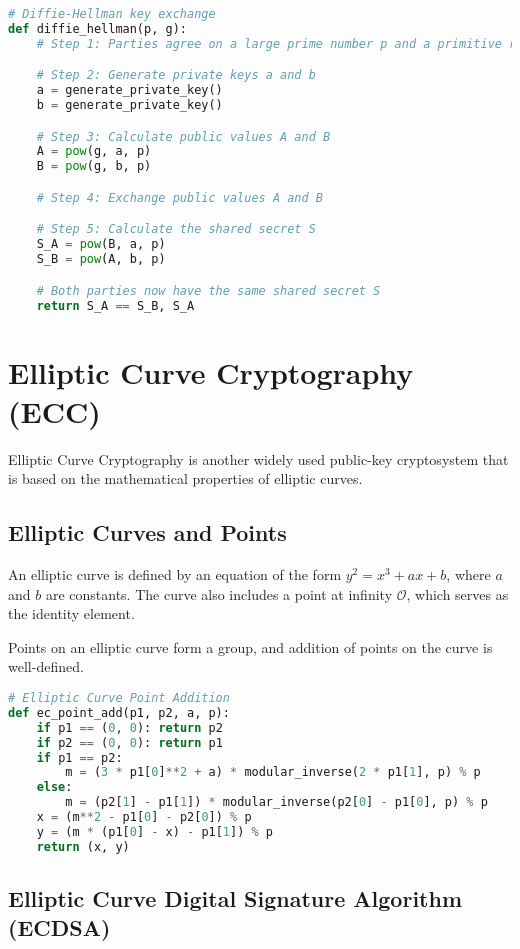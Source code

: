 \documentclass{article}
\begin{document}
\begin{lstlisting}[language=Python]
# Diffie-Hellman key exchange
def diffie_hellman(p, g):
    # Step 1: Parties agree on a large prime number p and a primitive root g modulo p

    # Step 2: Generate private keys a and b
    a = generate_private_key()
    b = generate_private_key()

    # Step 3: Calculate public values A and B
    A = pow(g, a, p)
    B = pow(g, b, p)

    # Step 4: Exchange public values A and B

    # Step 5: Calculate the shared secret S
    S_A = pow(B, a, p)
    S_B = pow(A, b, p)

    # Both parties now have the same shared secret S
    return S_A == S_B, S_A
\end{lstlisting}

\section{Elliptic Curve Cryptography (ECC)}

Elliptic Curve Cryptography is another widely used public-key cryptosystem that is based on the mathematical properties of elliptic curves.

\subsection{Elliptic Curves and Points}

An elliptic curve is defined by an equation of the form $y^2 = x^3 + ax + b$, where $a$ and $b$ are constants. The curve also includes a point at infinity $\mathcal{O}$, which serves as the identity element.

Points on an elliptic curve form a group, and addition of points on the curve is well-defined.

\begin{lstlisting}[language=Python]
# Elliptic Curve Point Addition
def ec_point_add(p1, p2, a, p):
    if p1 == (0, 0): return p2
    if p2 == (0, 0): return p1
    if p1 == p2:
        m = (3 * p1[0]**2 + a) * modular_inverse(2 * p1[1], p) % p
    else:
        m = (p2[1] - p1[1]) * modular_inverse(p2[0] - p1[0], p) % p
    x = (m**2 - p1[0] - p2[0]) % p
    y = (m * (p1[0] - x) - p1[1]) % p
    return (x, y)
\end{lstlisting}

\subsection{Elliptic Curve Digital Signature Algorithm (ECDSA)}
\end{document}
